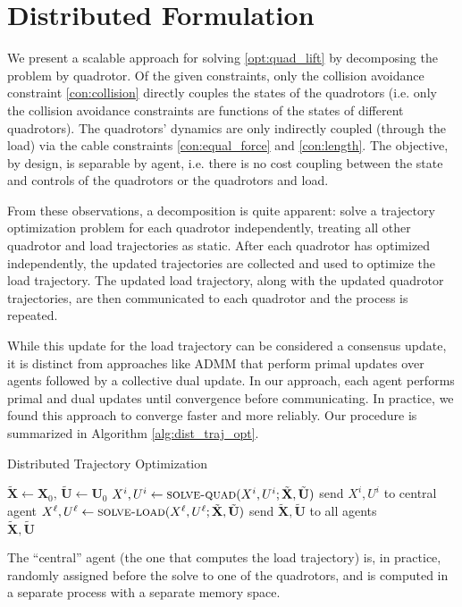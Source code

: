 \documentclass[../root.tex]{subfiles}
\begin{document}
\section{Distributed Formulation} \label{dist_batch_problem}
We present a scalable approach for solving \eqref{opt:quad_lift} by
decomposing the problem by quadrotor. Of the given constraints, only the
collision avoidance constraint \eqref{con:collision} directly couples the
states of the quadrotors (i.e. only the collision avoidance
constraints are functions of the states of different quadrotors). The
quadrotors' dynamics are only indirectly coupled (through the load) via the
cable constraints \eqref{con:equal_force} and \eqref{con:length}. The
objective, by design, is separable by agent, i.e. there is no cost
coupling between the state and controls of the quadrotors or the quadrotors
and load.

From these observations, a decomposition is quite apparent: solve a
trajectory optimization problem for each quadrotor independently, treating
all other quadrotor and load trajectories as static.
After each quadrotor has optimized independently, the
updated trajectories are collected and used to optimize the load trajectory.
The updated load trajectory, along with the updated quadrotor trajectories,
are then communicated to each quadrotor and the process is repeated.

While this update for the load trajectory can be considered a
consensus update, it is distinct from approaches like ADMM that perform
primal updates over agents followed by a collective dual update. In our
approach, each agent performs primal and dual updates until convergence
before communicating. In practice, we found this approach to converge faster
and more reliably. Our procedure is summarized in Algorithm
\ref{alg:dist_traj_opt}.

\begin{algorithm}[h]
	\begin{algorithmic}[1]
		\caption{Distributed Trajectory Optimization} \label{alg:dist_traj_opt}
		\State $\tilde{\textbf{X}} \leftarrow \textbf{X}_0, \, \tilde{\textbf{U}} \leftarrow \textbf{U}_0 $
		\State $X^i, U^i \leftarrow \Call{solve-quad}{X^i,U^i; \tilde{\textbf{X}},\tilde{\textbf{U}}}$
		\State send $X^i, U^i$ to central agent
		\EndFor
		\State $X^{\ell}, U^{\ell} \leftarrow \Call{solve-load}{X^\ell,U^\ell; \tilde{\textbf{X}},\tilde{\textbf{U}}}$
		\State send $\tilde{\textbf{X}},\tilde{\textbf{U}}$ to all agents
		\EndWhile \\
		\Return $\tilde{\textbf{X}},\tilde{\textbf{U}}$
		\EndFunction
	\end{algorithmic}
\end{algorithm}
\noindent The ``central'' agent (the one that computes the load trajectory)
is, in practice, randomly assigned before the solve to one of the quadrotors,
and is computed in a separate process with a separate memory space.
\end{document}
